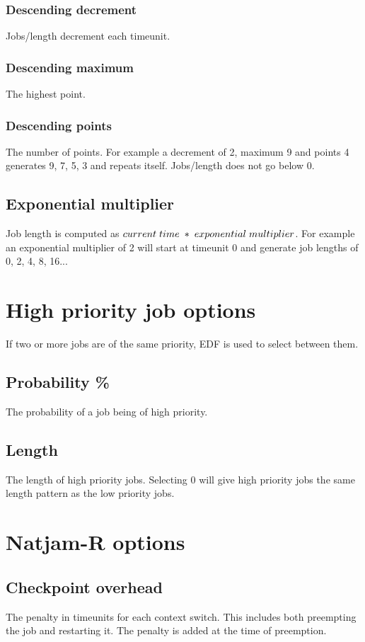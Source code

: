 \documentclass[11pt,oneside,a4paper]{article}
\begin{document}
\subsubsection{Descending decrement}
Jobs/length decrement each timeunit.
\subsubsection{Descending maximum}
The highest point.
\subsubsection{Descending points}
The number of points. For example a decrement of 2, maximum 9 and points 4 generates 9, 7, 5, 3 and repeats itself. Jobs/length does not go below 0.

\subsection{Exponential multiplier}
Job length is computed as $current \hspace{1mm} time \hspace{1mm} * \hspace{1mm} exponential \hspace{1mm} multiplier$. For example an exponential multiplier of 2 will start at timeunit 0 and generate job lengths of 0, 2, 4, 8, 16...

\section{High priority job options}
If two or more jobs are of the same priority, EDF is used to select between them.
\subsection{Probability \%}
The probability of a job being of high priority.
\subsection{Length}
The length of high priority jobs. Selecting 0 will give high priority jobs the same length pattern as the low priority jobs.

\section{Natjam-R options}
\subsection{Checkpoint overhead}
The penalty in timeunits for each context switch. This includes both preempting the job and restarting it. The penalty is added at the time of preemption.
\end{document}

